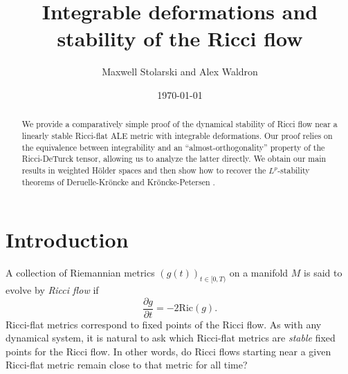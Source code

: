 \documentclass[12pt]{amsart}
\title{Integrable deformations and stability of the Ricci flow}
\author{Maxwell Stolarski and Alex Waldron}
\date{\today}
\renewcommand{\1}{{\mathbf 1}}
\newcommand{\Ric}{\mathrm{Ric}}
\theoremstyle{others}
\numberwithin{equation}{section}
\begin{document}
\begin{abstract}
We provide a comparatively simple proof of the dynamical stability of Ricci flow near a linearly stable Ricci-flat ALE metric with integrable deformations. %
Our proof relies on the equivalence between integrability and an ``almost-orthogonality'' property of the Ricci-DeTurck tensor, allowing us to analyze the latter directly. %
We obtain our main results in weighted H\"older spaces and then show how to recover the $L^p$-stability theorems of Deruelle-Kr\"oncke \cite{DeruelleKroncke20} and Kr\"oncke-Petersen \cite{KronckePetersen20}.
\end{abstract}






\maketitle


\tableofcontents





\thispagestyle{empty}





\section{Introduction}

A collection of Riemannian metrics $(g(t))_{t \in [0, T)}$ on a manifold $M$ is said to evolve by \emph{Ricci flow} if
    $$\frac{\partial g}{\partial t} = - 2 \Ric(g).$$
Ricci-flat metrics correspond to fixed points of the Ricci flow.
As with any dynamical system, it is natural to ask which Ricci-flat metrics are \emph{stable} fixed points for the Ricci flow.
In other words, do Ricci flows starting near a given Ricci-flat metric remain close to that %
metric for all time?
\end{document}
